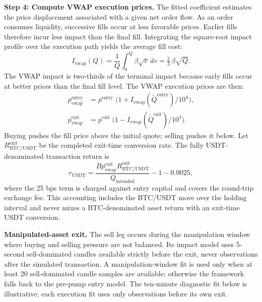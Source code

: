 \documentclass{ieeeaccess}
\begin{document}
\textbf{Step 4: Compute VWAP execution prices.} The fitted coefficient estimates the price displacement associated with a given net order flow. \textcolor{revisionblue}{As an} order \textcolor{revisionblue}{consumes liquidity, successive fills occur at less favorable prices. Earlier fills therefore incur less impact than} the \textcolor{revisionblue}{final fill. Integrating} the \textcolor{revisionblue}{square-root impact profile over} the \textcolor{revisionblue}{execution path yields} the average fill cost:
\begin{equation}
    I_{\mathrm{vwap}}(Q)
      = \frac{1}{Q}\int_{0}^{Q}\!\beta\sqrt{v}\,dv
      = \tfrac{2}{3}\,\beta\sqrt{Q}.
    \label{eq:vwap_correction}
\end{equation}
The VWAP impact is two-thirds of the terminal impact because early fills occur at better prices than the final fill level. The VWAP execution prices are then:
\begin{align}
    p^{\mathrm{entry}}_{\mathrm{vwap}} &= p^{\mathrm{entry}}\;\bigl(1 + I_{\mathrm{vwap}}(\widetilde Q^{\mathrm{entry}}) / 10^4\bigr), \label{eq:vwap_entry}\\
    p^{\mathrm{exit}}_{\mathrm{vwap}}  &= p^{\mathrm{exit}}\;\bigl(1 - I_{\mathrm{vwap}}(\widetilde Q^{\mathrm{exit}}) / 10^4\bigr). \label{eq:vwap_exit}
\end{align}
Buying pushes the fill price above the initial quote; selling pushes it below. Let $R^{\mathrm{exit}}_{\mathrm{BTC/USDT}}$ be the completed exit-time conversion rate. The fully USDT-denominated transaction return is
\begin{equation}
    r_{\mathrm{USDT}}
      = \frac{B p^{\mathrm{exit}}_{\mathrm{vwap}} R^{\mathrm{exit}}_{\mathrm{BTC/USDT}}}
             {Q_{\mathrm{intended}}}
        - 1 - 0.0025,
    \label{eq:tx_return}
\end{equation}
where the 25 bps term is charged against entry capital and covers the round-trip exchange fee. This accounting includes the BTC/USDT move over the holding interval and never mixes a BTC-denominated asset return with an exit-time USDT conversion.

\textbf{Manipulated-asset exit.} The sell leg occurs during the manipulation window where buying and selling pressure are not balanced. Its impact model uses 5-second sell-dominated candles available strictly before the exit, never observations after the simulated transaction. A manipulation-window fit is used only when at least 20 sell-dominated candle samples are available; otherwise the framework \textcolor{revisionblue}{falls back to} the pre-pump entry model. \textcolor{revisionblue}{The ten-minute diagnostic fit below is illustrative; each execution fit uses only observations before its own exit.}
\end{document}
